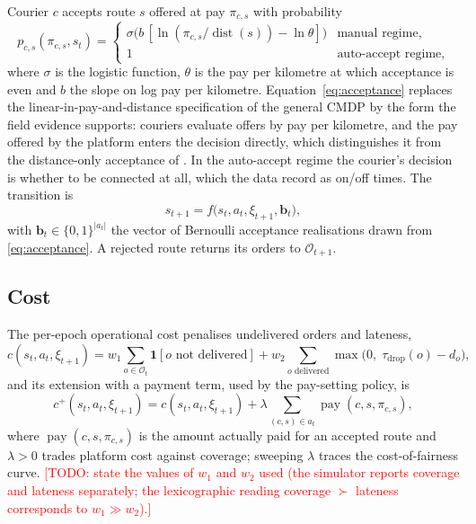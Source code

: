 \documentclass[preprint,12pt,authoryear]{elsarticle}%
\newcommand{\todo}[1]{\textcolor{red}{[TODO: #1]}}
\newcommand{\ind}{\mathbf{1}}
\DeclareMathOperator{\dist}{dist}
\DeclareMathOperator{\pay}{pay}
\begin{document}
Courier $c$ accepts route $s$ offered at pay $\pi_{c,s}$ with probability
\begin{equation}
p_{c,s}(\pi_{c,s}, s_t) =
\begin{cases}
\sigma\!\bigl(b\,[\ln(\pi_{c,s}/\dist(s)) - \ln\theta]\bigr) & \text{manual regime},\\[2pt]
1 & \text{auto-accept regime},
\end{cases}
\label{eq:acceptance}
\end{equation}
where $\sigma$ is the logistic function, $\theta$ is the pay per kilometre at which acceptance is even and $b$ the slope on log pay per kilometre. Equation~\eqref{eq:acceptance} replaces the linear-in-pay-and-distance specification of the general CMDP by the form the field evidence supports: couriers evaluate offers by pay per kilometre, and the pay offered by the platform enters the decision directly, which distinguishes it from the distance-only acceptance of \citet{quintero2020computational}. In the auto-accept regime the courier's decision is whether to be connected at all, which the data record as on/off times. The transition is
\begin{equation}
s_{t+1} = f\bigl(s_t, a_t, \xi_{t+1}, \mathbf{b}_t\bigr),
\label{eq:transition}
\end{equation}
with $\mathbf{b}_t \in \{0,1\}^{|a_t|}$ the vector of Bernoulli acceptance realisations drawn from \eqref{eq:acceptance}. A rejected route returns its orders to $\mathcal{O}_{t+1}$.

\subsection{Cost}

The per-epoch operational cost penalises undelivered orders and lateness,
\begin{equation}
c(s_t, a_t, \xi_{t+1}) = w_1 \sum_{o \in \mathcal{O}_t} \ind[o \text{ not delivered}] + w_2 \sum_{o \text{ delivered}} \max\bigl(0,\; \tau_{\text{drop}}(o) - d_o\bigr),
\label{eq:cost}
\end{equation}
and its extension with a payment term, used by the pay-setting policy, is
\begin{equation}
c^+(s_t, a_t, \xi_{t+1}) = c(s_t, a_t, \xi_{t+1}) + \lambda \sum_{(c,s) \in a_t} \pay(c, s, \pi_{c,s}),
\label{eq:cost_plus}
\end{equation}
where $\pay(c,s,\pi_{c,s})$ is the amount actually paid for an accepted route and $\lambda > 0$ trades platform cost against coverage; sweeping $\lambda$ traces the cost-of-fairness curve. \todo{state the values of $w_1$ and $w_2$ used (the simulator reports coverage and lateness separately; the lexicographic reading coverage $\succ$ lateness corresponds to $w_1 \gg w_2$).}
\end{document}
